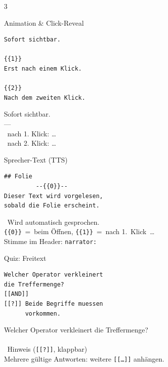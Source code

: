 \documentclass[a4paper,landscape,9pt]{extarticle}
\newcommand{\prevsm}[1]{{\footnotesize\color{muted} #1}}
\begin{document}
\begin{multicols}{3}
\begin{liacard}{Animation \& Click-Reveal}
\begin{lstlisting}[language=lia]
Sofort sichtbar.

{{1}}
Erst nach einem Klick.

{{2}}
Nach dem zweiten Klick.
\end{lstlisting}
\tcblower
\prevsm{Sofort sichtbar.\\
{\color{rulegray}---}\\
\faMousePointer~nach 1. Klick: \textit{\dots}\\
\faMousePointer~nach 2. Klick: \textit{\dots}}
\end{liacard}

\begin{liacard}{Sprecher-Text (TTS)}
\begin{lstlisting}[language=lia]
## Folie
         --{{0}}--
Dieser Text wird vorgelesen,
sobald die Folie erscheint.
\end{lstlisting}
\tcblower
\prevsm{\faVolumeUp~Wird automatisch
gesprochen.\\
\texttt{\{\{0\}\}}~=~beim Öffnen,
\texttt{\{\{1\}\}}~=~nach 1.~Klick~\dots\\[2pt]
{\footnotesize Stimme im Header: \texttt{narrator:}}}
\end{liacard}


\begin{liacard}{Quiz: Freitext}
\begin{lstlisting}[language=lia]
Welcher Operator verkleinert
die Treffermenge?
[[AND]]
[[?]] Beide Begriffe muessen
      vorkommen.
\end{lstlisting}
\tcblower
\prevsm{Welcher Operator verkleinert die Treffermenge?\\[2pt]
\fbox{\strut\hspace{6em}}\\[3pt]
\faQuestionCircle~Hinweis (\texttt{[[?]]}, klappbar)\\[2pt]
{\footnotesize Mehrere gültige Antworten: weitere \texttt{[[\dots]]} anhängen.}}
\end{liacard}


\end{multicols}
\end{document}
